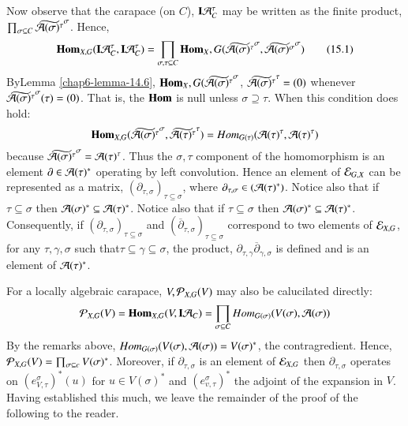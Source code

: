 Now observe that the carapace (on $C$), $\mathbf{I}\mathcal{A}_{C}^{\tau}$ may be written as the finite product, $\prod_{\sigma \subseteq C}\widetilde{\mathcal{A}(\sigma)^{\tau}}^{\sigma}$. Hence,
\begin{equation*}\label{chap6-eq-15.1}
\operatorname{\mathbf{Hom}}_{X, G}(\mathbf{I} \mathcal{A}_{C}^{\tau}, \mathbf{I}\mathcal{A}_{C}^{\tau}) = \prod_{\sigma, \tau \subseteq C}\operatorname{\mathbf{Hom}}_{X}, G(\widetilde{\mathcal{A}(\sigma)^{\tau}}^{\sigma}, \widetilde{\mathcal{A}(\sigma)^{\sigma}}^{\sigma})\tag{15.1}
\end{equation*}
By\pageoriginale Lemma \ref{chap6-lemma-14.6}, $\operatorname{\mathbf{Hom}}_{X}, G(\widetilde{\mathcal{A}(\sigma)^\tau}^{\sigma}$, $\widetilde{\mathcal{A}(\sigma)^\tau}^{\tau} = (0)$ whenever $\widetilde{\calA(\sigma)^{\tau}}^{\sigma}(\tau)\break = (0)$. That is, the $\operatorname{\mathbf{Hom}}$ is null unless $\sigma \supseteq \tau$. When this condition does hold:
$$
\operatorname{\mathbf{Hom}}_{X, G}(\widetilde{\mathcal{A}(\sigma)^{\tau}}^{\sigma}, \widetilde{\mathcal{A}(\tau)^\tau}^{\tau}) = Hom_{G(\tau)}(\mathcal{A}(\tau)^{\tau}, \mathcal{A}(\tau)^{\tau})
$$
because $\widetilde{\mathcal{A}(\sigma)^{\tau}}^{\sigma} = \mathcal{A}(\tau)^{\tau}$. Thus the $\sigma, \tau$ component of the homomorphism is an element $\partial \in \mathcal{A}(\tau)^{*}$ operating by left convolution. Hence an element of $\mathcal{E}_{G, X}$ can be represented as a matrix, $(\partial_{\tau, \sigma})_{\tau \subseteq \sigma}$, where $\partial_{\tau, \sigma} \in (\mathcal{A}(\tau)^{*})$. Notice also that if $\tau \subseteq \sigma$ then $\mathcal{A}(\sigma)^{*} \subseteq \mathcal{A}(\tau)^{*}$. Notice also that if $\tau \subseteq \sigma$ then $\mathcal{A}(\sigma)^{*} \subseteq \mathcal{A}(\tau)^{*}$. Consequently, if $(\partial_{\tau, \sigma})_{\tau \subseteq \sigma}$ and $(\overline{\partial}_{\tau, \sigma})_{\tau \subseteq \sigma}$ correspond to two elements of $\mathcal{E}_{X, G}$, for any $\tau, \gamma, \sigma$ such that$\tau \subseteq \gamma \subseteq \sigma$, the product, $\partial_{\tau, \gamma}\overline{\partial}_{\gamma, \sigma}$ is defined and is an element of $\mathcal{A}(\tau)^{*}$.

For a locally algebraic carapace, $V, \mathcal{P}_{X, G}(V)$ may also be calucilated directly: 
$$
\mathcal{P}_{X, G}(V)=  \operatorname{\mathbf{Hom}}_{X, G}(V, \mathbf{I} \mathcal{A}_{C}) = \prod_{\sigma \subseteq C}Hom_{G(\sigma)}(V(\sigma), \mathcal{A}(\sigma))
$$
By the remarks above, $Hom_{G(\sigma)}(V(\sigma), \mathcal{A}(\sigma))= V(\sigma)^{*}$, the contragredient. Hence, $\mathcal{P}_{X, G}(V) = \prod_{\sigma \subseteq c}V(\sigma)^{*}$. Moreover, if $\partial_{\tau, \sigma}$ is an element of $\mathcal{E}_{X, G}$ then $\partial_{\tau, \sigma}$ operates on $\left(e_{V, \tau}^{\sigma}\right)^{*}(u)$ for $u \in V(\sigma)^{*}$ and $(e_{v, \tau}^{\sigma})^{*}$ the adjoint of the expansion in $V$. Having established this much, we leave the remainder of the proof of the following to the reader.

